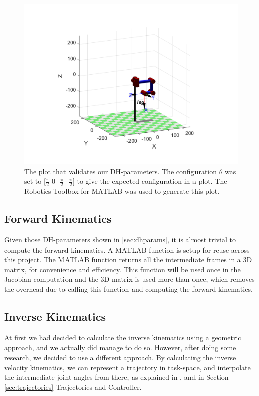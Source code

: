 \begin{figure}[thpb]
    \parbox{\linewidth}{\includegraphics[width=\linewidth]{Figures/dhvalidation.png}}
    \caption{The plot that validates our DH-parameters. The configuration $\theta$ was set to [$\frac{\pi}{2}$ 0 -$\frac{\pi}{2}$ -$\frac{\pi}{2}$] to give the expected configuration in a plot. The Robotics Toolbox for MATLAB was used to generate this plot.}
    \label{fig:dhvalidation}
\end{figure}

\subsection{Forward Kinematics}
Given those DH-parameters shown in \ref{sec:dhparams}, it is almost trivial to compute the forward kinematics. A MATLAB function is setup for reuse across this project. The MATLAB function returns all the intermediate frames in a 3D matrix, for convenience and efficiency. This function will be used once in the Jacobian computation and the 3D matrix is used more than once, which removes the overhead due to calling this function and computing the forward kinematics.

\subsection{Inverse Kinematics}
At first we had decided to calculate the inverse kinematics using a geometric approach, and we actually did manage to do so. However, after doing some research, we decided to use a different approach. By calculating the inverse velocity kinematics, we can represent a trajectory in task-space, and interpolate the intermediate joint angles from there, as explained in \cite{spong2006robot}, and in Section \ref{sec:trajectories} Trajectories and Controller.



